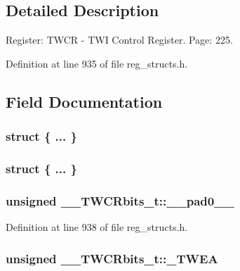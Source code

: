\subsection{Detailed Description}
Register\+: T\+W\+C\+R -\/ T\+W\+I Control Register. Page\+: 225. 

Definition at line 935 of file reg\+\_\+structs.\+h.



\subsection{Field Documentation}
\hypertarget{union_____t_w_c_rbits__t_aa0db8c3ee63a9b3f53a7907b6dab9fd0}{\subsubsection[{"@229}]{\setlength{\rightskip}{0pt plus 5cm}struct \{ ... \} }}\label{union_____t_w_c_rbits__t_aa0db8c3ee63a9b3f53a7907b6dab9fd0}
\hypertarget{union_____t_w_c_rbits__t_ad8cdd41b5a4364250f3b4b728ff27aad}{\subsubsection[{"@231}]{\setlength{\rightskip}{0pt plus 5cm}struct \{ ... \} }}\label{union_____t_w_c_rbits__t_ad8cdd41b5a4364250f3b4b728ff27aad}
\hypertarget{union_____t_w_c_rbits__t_a87365edbabc992daafd4bac1eb1303f2}{
\subsubsection[{\+\_\+\+\_\+pad0\+\_\+\+\_\+}]{\setlength{\rightskip}{0pt plus 5cm}unsigned \+\_\+\+\_\+\+T\+W\+C\+Rbits\+\_\+t\+::\+\_\+\+\_\+pad0\+\_\+\+\_\+}}\label{union_____t_w_c_rbits__t_a87365edbabc992daafd4bac1eb1303f2}


Definition at line 938 of file reg\+\_\+structs.\+h.

\hypertarget{union_____t_w_c_rbits__t_a087c9931a3756219b4a6fe6701724dc5}{
\subsubsection[{\+\_\+\+T\+W\+E\+A}]{\setlength{\rightskip}{0pt plus 5cm}unsigned \+\_\+\+\_\+\+T\+W\+C\+Rbits\+\_\+t\+::\+\_\+\+T\+W\+E\+A}}\label{union_____t_w_c_rbits__t_a087c9931a3756219b4a6fe6701724dc5}


